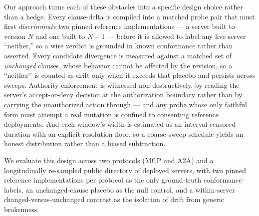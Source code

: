 \documentclass[11pt]{article}
\begin{document}
Our approach turns each of these obstacles into a specific design choice rather than a hedge. Every clause-delta is compiled into a matched probe pair that must first \emph{discriminate} two pinned reference implementations --- a server built to version $N$ and one built to $N{+}1$ --- before it is allowed to label any live server ``neither,'' so a wire verdict is grounded in known conformance rather than asserted. Every candidate divergence is measured against a matched set of \emph{unchanged} clauses, whose behavior cannot be affected by the revision, so a ``neither'' is counted as drift only when it exceeds that placebo and persists across sweeps. Authority enforcement is witnessed non-destructively, by reading the server's accept-or-deny decision at the authorization boundary rather than by carrying the unauthorized action through --- and any probe whose only faithful form must attempt a real mutation is confined to consenting reference deployments. And each window's width is estimated as an interval-censored duration with an explicit resolution floor, so a coarse sweep schedule yields an honest distribution rather than a biased subtraction.

We evaluate this design across two protocols (MCP and A2A) and a longitudinally re-sampled public directory of deployed servers, with two pinned reference implementations per protocol as the only ground-truth conformance labels, an unchanged-clause placebo as the null control, and a within-server changed-versus-unchanged contrast as the isolation of drift from generic brokenness.
\end{document}
